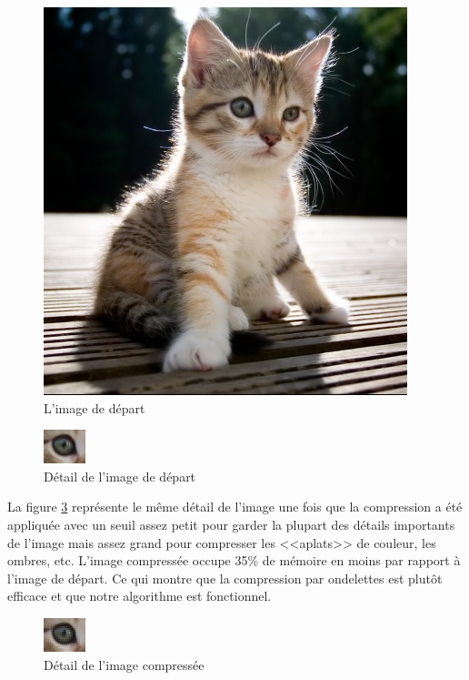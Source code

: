 \documentclass{article}
\begin{document}
\begin{figure}[!h]
\centering
\includegraphics[scale=0.8]{chat.jpg}
\caption{L'image de départ}
\label{chat1}
\end{figure}

\begin{figure}[!h]
\centering
\includegraphics[scale=2]{chat_orig.jpg}
\caption{Détail de l'image de départ}
\label{dchat}
\end{figure}

La figure \ref{chat2} représente le même détail de l'image une fois que la compression a été appliquée avec un seuil assez petit pour garder la plupart des détails importants de l'image mais assez grand pour compresser les <<aplats>> de couleur, les ombres, etc. L'image compressée occupe 35\% de mémoire en moins par rapport à l'image de départ. Ce qui montre que la compression par ondelettes est plutôt efficace et que notre algorithme est fonctionnel.

\begin{figure}[!h]
\centering
\includegraphics[scale=2]{chat_compress.jpg}
\caption{Détail de l'image compressée}
\label{chat2}
\end{figure}
\end{document}
